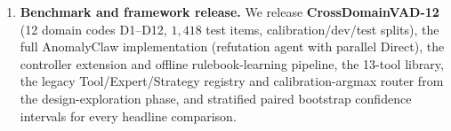 \begin{enumerate}
    \item \textbf{Benchmark and framework release.} We release \textbf{CrossDomainVAD-12} (12 domain codes D1--D12, $1{,}418$ test items, calibration/dev/test splits), the full AnomalyClaw implementation (refutation agent with parallel Direct), the controller extension and offline rulebook-learning pipeline, the 13-tool library, the legacy Tool/Expert/Strategy registry and calibration-argmax router from the design-exploration phase, and stratified paired bootstrap confidence intervals for every headline comparison.
\end{enumerate}
